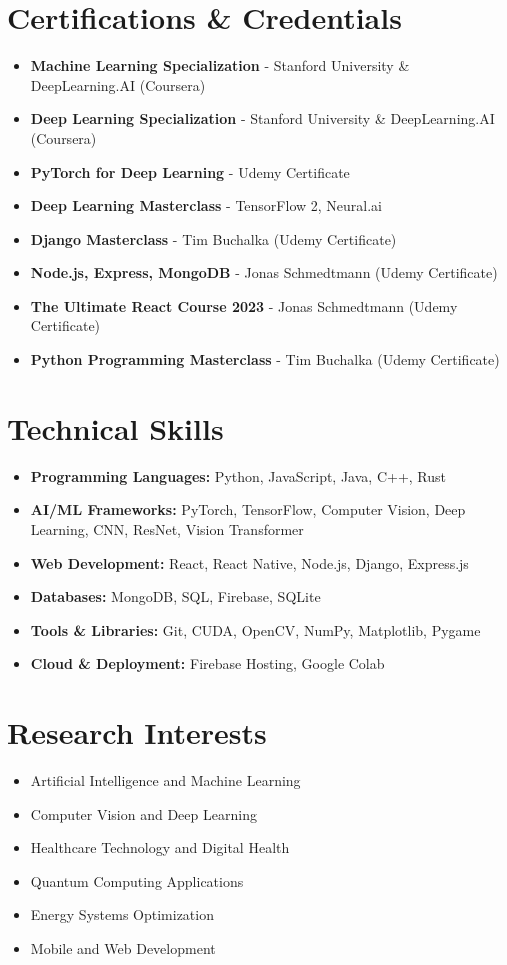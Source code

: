 \documentclass[11pt,a4paper]{article}
\newcommand{\skill}[1]{\textbf{#1}}
\begin{document}
\section*{Certifications \& Credentials}
\noindent
\begin{itemize}[nosep]
    \item \textbf{Machine Learning Specialization} - Stanford University \& DeepLearning.AI (Coursera)
    \item \textbf{Deep Learning Specialization} - Stanford University \& DeepLearning.AI (Coursera)
    \item \textbf{PyTorch for Deep Learning} - Udemy Certificate
    \item \textbf{Deep Learning Masterclass} - TensorFlow 2, Neural.ai
    \item \textbf{Django Masterclass} - Tim Buchalka (Udemy Certificate)
    \item \textbf{Node.js, Express, MongoDB} - Jonas Schmedtmann (Udemy Certificate)
    \item \textbf{The Ultimate React Course 2023} - Jonas Schmedtmann (Udemy Certificate)
    \item \textbf{Python Programming Masterclass} - Tim Buchalka (Udemy Certificate)
\end{itemize}

\section*{Technical Skills}
\noindent
\begin{itemize}[nosep]
    \item \skill{Programming Languages:} Python, JavaScript, Java, C++, Rust
    \item \skill{AI/ML Frameworks:} PyTorch, TensorFlow, Computer Vision, Deep Learning, CNN, ResNet, Vision Transformer
    \item \skill{Web Development:} React, React Native, Node.js, Django, Express.js
    \item \skill{Databases:} MongoDB, SQL, Firebase, SQLite
    \item \skill{Tools \& Libraries:} Git, CUDA, OpenCV, NumPy, Matplotlib, Pygame
    \item \skill{Cloud \& Deployment:} Firebase Hosting, Google Colab
\end{itemize}

\section*{Research Interests}
\noindent
\begin{itemize}[nosep]
    \item Artificial Intelligence and Machine Learning
    \item Computer Vision and Deep Learning
    \item Healthcare Technology and Digital Health
    \item Quantum Computing Applications
    \item Energy Systems Optimization
    \item Mobile and Web Development
\end{itemize}
\end{document}
